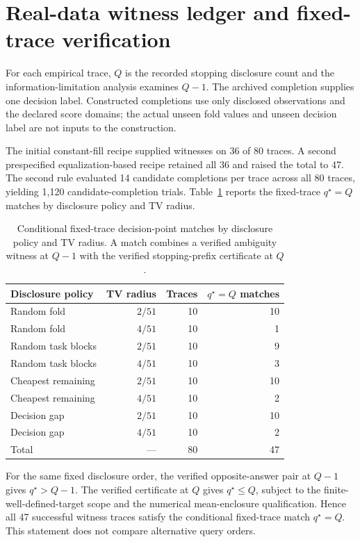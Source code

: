 \documentclass[preprint,11pt]{elsarticle}
\begin{document}
\section{Real-data witness ledger and fixed-trace verification}\label{app:witness}
For each empirical trace, $Q$ is the recorded stopping disclosure count and the information-limitation analysis examines $Q-1$. The archived completion supplies one decision label. Constructed completions use only disclosed observations and the declared score domains; the actual unseen fold values and unseen decision label are not inputs to the construction.

The initial constant-fill recipe supplied witnesses on 36 of 80 traces. A second prespecified equalization-based recipe retained all 36 and raised the total to 47. The second rule evaluated 14 candidate completions per trace across all 80 traces, yielding 1,120 candidate-completion trials. Table~\ref{tab:app_qmatch} reports the fixed-trace $q^\star=Q$ matches by disclosure policy and TV radius.

\begin{table}[H]
\centering
\caption{Conditional fixed-trace decision-point matches by disclosure policy and TV radius. A match combines a verified ambiguity witness at $Q-1$ with the verified stopping-prefix certificate at $Q$.}
\label{tab:app_qmatch}
\footnotesize
\begin{tabular}{lrrr}
\toprule
Disclosure policy & TV radius & Traces & $q^\star=Q$ matches\\
\midrule
Random fold & $2/51$ & 10 & 10\\
Random fold & $4/51$ & 10 & 1\\
Random task blocks & $2/51$ & 10 & 9\\
Random task blocks & $4/51$ & 10 & 3\\
Cheapest remaining & $2/51$ & 10 & 10\\
Cheapest remaining & $4/51$ & 10 & 2\\
Decision gap & $2/51$ & 10 & 10\\
Decision gap & $4/51$ & 10 & 2\\
\midrule
Total & --- & 80 & 47\\
\bottomrule
\end{tabular}
\end{table}

For the same fixed disclosure order, the verified opposite-answer pair at $Q-1$ gives $q^\star>Q-1$. The verified certificate at $Q$ gives $q^\star\le Q$, subject to the finite-well-defined-target scope and the numerical mean-enclosure qualification. Hence all 47 successful witness traces satisfy the conditional fixed-trace match $q^\star=Q$. This statement does not compare alternative query orders.
\end{document}
